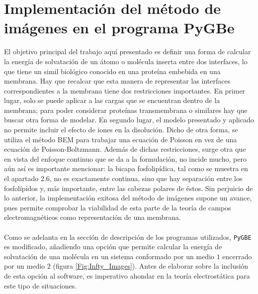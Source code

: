 \documentclass[12pt, twoside, onehalfspace, numbers, spanish]{ezthesis}
\numberwithin{equation}{section}
\begin{document}
\section{Implementación del método de imágenes en el programa PyGBe}\label{Sec:Implementation}
El objetivo principal del trabajo aquí presentado es definir una forma de calcular la energía de solvatación de un átomo o molécula inserta entre dos interfaces, lo que tiene un simil biológico conocido en una proteína embebida en una membrana. Hay que recalcar que esta manera de representar las interfaces correspondientes a la membrana tiene dos restricciones importantes. En primer lugar, solo se puede aplicar a las cargas que se encuentran dentro de la membrana; para poder considerar proteínas transmembrana o similares hay que buscar otra forma de modelar. En segundo lugar, el modelo presentado y aplicado no permite incluir el efecto de iones en la disolución. Dicho de otra forma, se utiliza el método BEM para trabajar una ecuación de Poisson en vez de una ecuación de Poisson-Boltzmann. Además de dichas restricciones, surge otra que en vista del enfoque continuo que se da a la formulación, no incide mucho, pero aún así es importante mencionar: la bicapa fosfolipídica, tal como se muestra en el apartado 2.6, no es exactamente continua, sino que hay separación entre los fosfolípidos y, más importante, entre las cabezas polares de éstos. Sin perjuicio de lo anterior, la implementación exitosa del método de imágenes supone un avance, pues permite comprobar la viabilidad de esta parte de la teoría de campos electromagnéticos como representación de una membrana.\\\\
Como se adelanta en la sección de descripción de los programas utilizados, \texttt{PyGBE} es modificado, añadiendo una opción que permite calcular la energía de solvatación de una molécula en un sistema conformado por un medio $1$ encerrado por un medio $2$ (figura \ref{Fig:Infty_Images}). Antes de elaborar sobre la inclusión de esta opción al software, es imperativo ahondar en la teoría electrostática para este tipo de situaciones.
\end{document}

